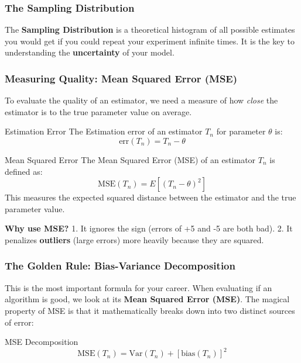 \subsubsection{The Sampling Distribution}
The \textbf{Sampling Distribution} is a theoretical histogram of all possible estimates you would get if you could repeat your experiment infinite times. It is the key to understanding the \textbf{uncertainty} of your model.

\subsubsection{Measuring Quality: Mean Squared Error (MSE)}


To evaluate the quality of an estimator, we need a measure of how \textit{close} the estimator is to the true parameter value on average.

\begin{defbox}{Estimation Error}
The Estimation error of an estimator $T_n$ for parameter $\theta$ is:
\begin{equation}
\text{err}(T_n) = T_n - \theta
\end{equation}
\end{defbox}

\begin{defbox}{Mean Squared Error}
The Mean Squared Error (MSE) of an estimator $T_n$ is defined as:
\begin{equation}
\text{MSE}(T_n) = E\left[(T_n - \theta)^2\right]
\end{equation}
This measures the expected squared distance between the estimator and the true parameter value.
\end{defbox}

\textbf{Why use MSE?} 
1. It ignores the sign (errors of +5 and -5 are both bad).
2. It penalizes \textbf{outliers} (large errors) more heavily because they are squared.

\subsubsection{The Golden Rule: Bias-Variance Decomposition}
This is the most important formula for your career.  When evaluating if an algorithm is good, we look at its \textbf{Mean Squared Error (MSE)}. The magical property of MSE is that it mathematically breaks down into two distinct sources of error:


\begin{defbox}{MSE Decomposition}
\begin{equation}
\text{MSE}(T_n) = \text{Var}(T_n) + \left[\text{bias}(T_n)\right]^2
\end{equation}
\end{defbox}





